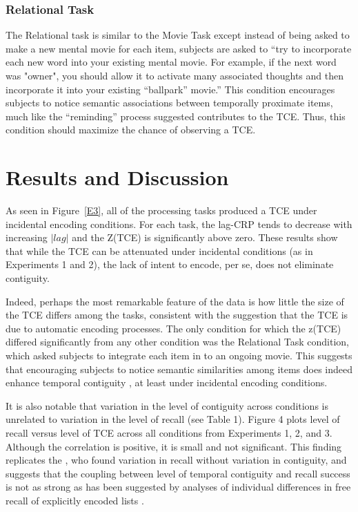 \documentclass[jou,natbib,floatsintext]{apa6} %
\begin{document}
\subsubsection{Relational Task} The Relational task is similar to the Movie Task except instead of being asked to make a new mental movie for each item, subjects are asked to ``try to incorporate each new word into your existing mental movie. For example, if the next word was "owner", you should allow it to activate many associated thoughts and then incorporate it into your existing ``ballpark'' movie.'' This condition encourages subjects to notice semantic associations between temporally proximate items, much like the ``reminding'' process \cite{Hint16} suggested contributes to the TCE. Thus, this condition should maximize the chance of observing a TCE. 

\section{Results and Discussion}

As seen in Figure~\ref{E3}, all of the processing tasks produced a TCE under incidental encoding conditions. For each task, the lag-CRP tends to decrease with increasing $|lag|$ and the Z(TCE) is significantly above zero. These results show that while the TCE can be attenuated under incidental conditions (as in Experiments 1 and 2), the lack of intent to encode, per se, does not eliminate contiguity. 

Indeed, perhaps the most remarkable feature of the data is how little the size of the TCE differs among the tasks, consistent with the suggestion that the TCE is due to automatic encoding processes. The only condition for which the z(TCE) differed significantly from any other condition was the Relational Task condition, which asked subjects to integrate each item in to an ongoing movie. This suggests that encouraging subjects to notice semantic similarities among items does indeed enhance temporal contiguity \citep{Hint16}, at least  under incidental encoding conditions. 

It is also notable that variation in the level of contiguity across conditions is unrelated to variation in the level of recall (see Table 1). Figure 4 plots level of recall versus level of TCE across all conditions from Experiments 1, 2, and 3. Although the correlation is positive, it is small and not significant.  This finding replicates the \citep{NairEtal17}, who found variation in recall without variation in contiguity, and suggests that the coupling between level of temporal contiguity and recall success is not as strong as has been suggested by analyses of individual differences in free recall of explicitly encoded lists \citep{SedeEtal10,Healetal14}. 
\end{document}
